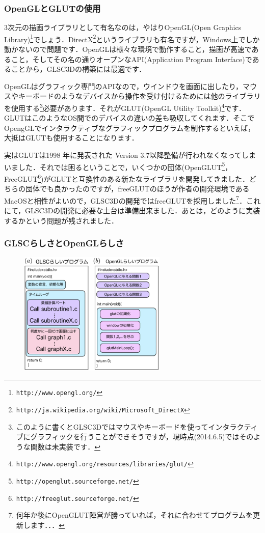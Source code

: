 \documentclass[platex,a4paper,12pt]{jsarticle}%
\begin{document}
\subsubsection{OpenGLとGLUTの使用}
3次元の描画ライブラリとして有名なのは，やはりOpenGL(Open Graphics Library)\footnote{\verb|http://www.opengl.org/|}でしょう．DirectX\footnote{\verb|http://ja.wikipedia.org/wiki/Microsoft_DirectX|}というライブラリも有名ですが，Windows上でしか動かないので問題です．OpenGLは様々な環境で動作すること，描画が高速であること，そしてその名の通りオープンなAPI(Application Program Interface)であることから，GLSC3Dの構築には最適です．

OpenGLはグラフィック専門のAPIなので，ウインドウを画面に出したり，マウスやキーボードのようなデバイスから操作を受け付けるためには他のライブラリを使用する\footnote{このように書くとGLSC3Dではマウスやキーボードを使ってインタラクティブにグラフィックを行うことができそうですが，現時点(2014.6.5)ではそのような関数は未実装です．}必要があります．それがGLUT(OpenGL Utility Toolkit)\footnote{\verb|http://www.opengl.org/resources/libraries/glut/|}です．GLUTはこのようなOS間でのデバイスの違いの差も吸収してくれます．そこでOpengGLでインタラクティブなグラフィックプログラムを制作するといえば，大抵はGLUTも使用することになります．

実はGLUTは1998 年に発表された Version 3.7以降整備が行われなくなってしまいました．それでは困るということで，いくつかの団体(OpenGLUT\footnote{\verb|http://openglut.sourceforge.net/|}，FreeGLUT\footnote{\verb|http://freeglut.sourceforge.net/|})がGLUTと互換性のある新たなライブラリを開発してきました．どちらの団体でも良かったのですが，freeGLUTのほうが作者の開発環境であるMacOSと相性がよいので，GLSC3Dの開発ではfreeGLUTを採用しました\footnote{何年か後にOpenGLUT陣営が勝っていれば，それに合わせてプログラムを更新します．．．}．これにて，GLSC3Dの開発に必要な土台は準備出来ました．あとは，どのように実装するかという問題が残されました．

\subsubsection{GLSCらしさとOpenGLらしさ}

\begin{figure}
\vspace{-1\baselineskip}
	\includegraphics[width=70mm]{./Figures/eps/002.eps}
\end{figure}
\end{document}
